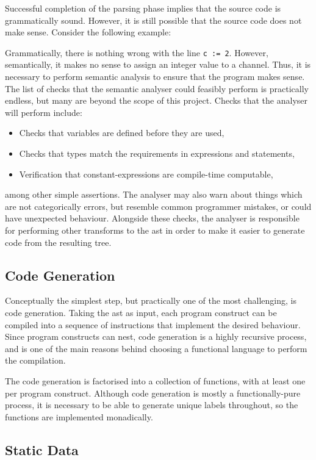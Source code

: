 Successful completion of the parsing phase implies that the source code is
grammatically sound. However, it is still possible that the source code does not
make sense. Consider the following example:

Grammatically, there is nothing wrong with the line \texttt{c := 2}. However,
semantically, it makes no sense to assign an integer value to a channel. Thus,
it is necessary to perform semantic analysis to ensure that the program makes
sense. The list of checks that the semantic analyser could feasibly perform is
practically endless, but many are beyond the scope of this project. Checks that
the analyser will perform include:
\begin{itemize}
  \item Checks that variables are defined before they are used,
  \item Checks that types match the requirements in expressions and statements,
  \item Verification that constant-expressions are compile-time computable,
\end{itemize}
among other simple assertions. The analyser may also warn about things which are
not categorically errors, but resemble common programmer mistakes, or could have
unexpected behaviour. Alongside these checks, the analyser is responsible for
performing other transforms to the \gls{ast} in order to make it easier to
generate code from the resulting tree.

\subsection{Code Generation}

Conceptually the simplest step, but practically one of the most challenging,
is code generation. Taking the \gls{ast} as input, each program construct can be
compiled into a sequence of instructions that implement the desired behaviour.
Since program constructs can nest, code generation is a highly recursive
process, and is one of the main reasons behind choosing a functional language to
perform the compilation.

The code generation is factorised into a collection of functions, with at least
one per program construct. Although code generation is mostly a
functionally-pure process, it is necessary to be able to generate unique labels
throughout, so the functions are implemented monadically.

\subsection{Static Data} \label{static-blob}

